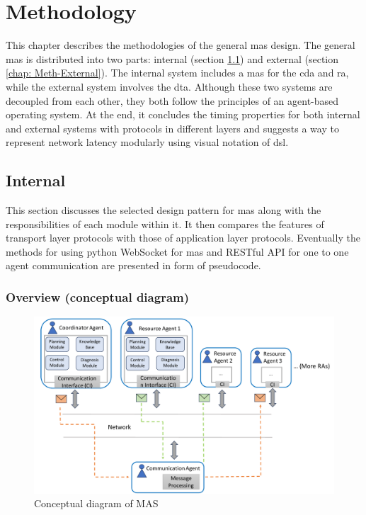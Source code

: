 \chapter{Methodology}\label{chap: Meth}%
This chapter describes the methodologies of the general \gls{mas} design. 
The general \gls{mas} is distributed into two parts: internal (section \ref{chap: Meth-Internal}) 
and external (section \ref{chap: Meth-External}).  
The internal system includes a \gls{mas} for the \gls{cda} and \gls{ra}, 
while the external system involves the \gls{dta}. 
Although these two systems are decoupled from each other, 
they both follow the principles of an agent-based operating system. 
At the end, it concludes the timing properties for both 
internal and external systems with protocols in 
different layers and suggests a way to represent 
network latency modularly using visual notation of \gls{dsl}.
\section{Internal}\label{chap: Meth-Internal}
This section discusses the selected design pattern for \gls{mas} along 
with the responsibilities of each module within it.
It then compares the features of transport layer protocols with those of 
application layer protocols.
Eventually the methods for using python WebSocket for \gls{mas} and 
RESTful API for one to one agent communication are presented in form of pseudocode. 

\subsection{Overview (conceptual diagram)}

\begin{figure}[htb]
\includegraphics[width=\textwidth]{figures/MAS_Conceptual_Diagram.pdf}
\centering
\caption{Conceptual diagram of MAS\label{fig: MASConceptual}}
\end{figure}

